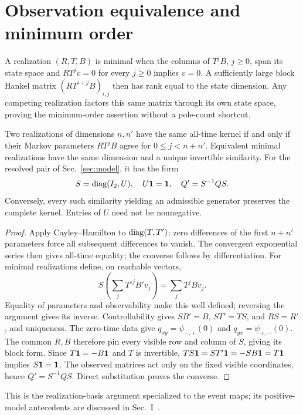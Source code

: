 \section{Observation equivalence and minimum order}\label{app:realization}
A realization $(R,T,B)$ is minimal when the columns of $T^jB$, $j\ge0$, span its state space and $RT^jv=0$ for every $j\ge0$ implies $v=0$. A sufficiently large block Hankel matrix $(RT^{i+j}B)_{i,j}$ then has rank equal to the state dimension. Any competing realization factors this same matrix through its own state space, proving the minimum-order assertion without a pole-count shortcut.

\begin{lemma}\label{lem:orbit}
Two realizations of dimensions $n,n'$ have the same all-time kernel if and only if their Markov parameters $RT^jB$ agree for $0\le j<n+n'$. Equivalent minimal realizations have the same dimension and a unique invertible similarity. For the resolved pair of Sec.~\ref{sec:model}, it has the form
\begin{equation}
 S=\operatorname{diag}(I_2,U),\quad U\mathbf 1=\mathbf 1,\quad Q'=S^{-1}QS.\label{eq:orbit}
\end{equation}
Conversely, every such similarity yielding an admissible generator preserves the complete kernel. Entries of $U$ need not be nonnegative.
\end{lemma}
\begin{proof}
Apply Cayley--Hamilton to $\operatorname{diag}(T,T')$: zero differences of the first $n+n'$ parameters force all subsequent differences to vanish. The convergent exponential series then gives all-time equality; the converse follows by differentiation. For minimal realizations define, on reachable vectors,
\begin{equation}
 S\left(\sum_jT'^jB'v_j\right)=\sum_jT^jBv_j.
\end{equation}
Equality of parameters and observability make this well defined; reversing the argument gives its inverse. Controllability gives $SB'=B$, $ST'=TS$, and $RS=R'$, and uniqueness. The zero-time data give $q_{xy}=\psi_{-,+}(0)$ and $q_{yx}=\psi_{+,-}(0)$. The common $R,B$ therefore pin every visible row and column of $S$, giving its block form. Since $T\mathbf 1=-B\mathbf 1$ and $T$ is invertible, $TS\mathbf 1=ST'\mathbf 1=-SB\mathbf 1=T\mathbf 1$ implies $S\mathbf 1=\mathbf 1$. The observed matrices act only on the fixed visible coordinates, hence $Q'=S^{-1}QS$. Direct substitution proves the converse.
\end{proof}
This is the realization-basis argument specialized to the event maps; its positive-model antecedents are discussed in Sec.~I~\cite{Vanluyten2008,HorvathTelek2007}.

